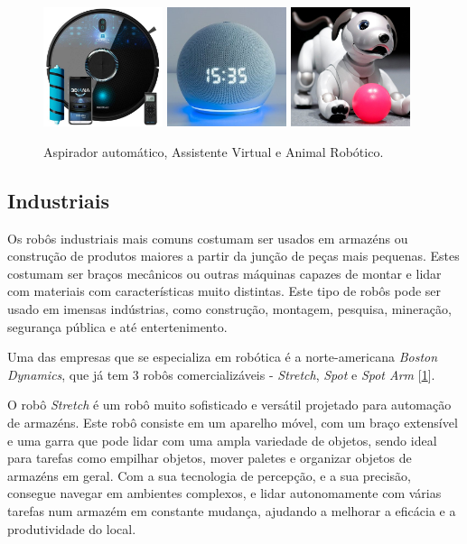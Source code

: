 \documentclass[10pt]{article}
\begin{document}
\begin{figure}[!h]
\centering
\includegraphics[width = 3.5cm]{img/aspirador.jpg}
\includegraphics[width = 3.5cm]{img/assistente-virtual.jpg}
\includegraphics[width = 3.5cm]{img/aibo.jpg}
\label{Robôs Boston Dynamics}
\caption{Aspirador automático, Assistente Virtual e Animal Robótico.}
\end{figure}


\subsection{Industriais}
\hspace{\parindent}Os robôs industriais mais comuns costumam ser usados em armazéns ou construção de produtos maiores a partir da junção de peças mais pequenas. Estes costumam ser braços mecânicos ou outras máquinas capazes de montar e lidar com materiais com características muito distintas. Este tipo de robôs pode ser usado em imensas indústrias, como construção, montagem, pesquisa, mineração, segurança pública e até entertenimento.

Uma das empresas que se especializa em robótica é a norte-americana \emph{Boston Dynamics}, que já tem 3 robôs comercializáveis - \emph{Stretch}, \emph{Spot} e \emph{Spot Arm} [\ref{Robôs Boston Dynamics}].

O robô \emph{Stretch}\cite{stretch} é um robô muito sofisticado e versátil projetado para automação de armazéns. Este robô consiste em um aparelho móvel, com um braço extensível e uma garra que pode lidar com uma ampla variedade de objetos, sendo ideal para tarefas como empilhar objetos, mover paletes e organizar objetos de armazéns em geral. Com a sua tecnologia de percepção, e a sua precisão, consegue navegar em ambientes complexos, e lidar autonomamente com várias tarefas num armazém em constante mudança, ajudando a melhorar a eficácia e a produtividade do local.
\end{document}
